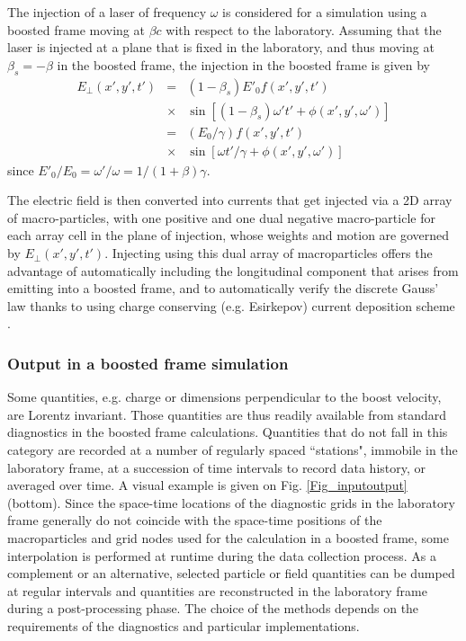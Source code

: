 The injection of a laser of frequency $\omega$ is considered for a simulation using a boosted frame moving at $\beta c$ with respect to the laboratory. Assuming that the laser is injected at a plane that is fixed in the laboratory, and thus moving at $\beta_s=-\beta$ in the boosted frame, the injection in the boosted frame is given by
\begin{eqnarray}
E_\perp\left(x',y',t'\right)&=&\left(1-\beta_s\right)E'_0 f\left(x',y',t'\right)\nonumber \\
&\times&\sin\left[\left(1-\beta_s\right)\omega' t'+\phi\left(x',y',\omega'\right)\right]\\
&=&\left(E_0/\gamma\right) f\left(x',y',t'\right) \nonumber\\
&\times&\sin\left[\omega t'/\gamma+\phi\left(x',y',\omega'\right)\right]
\end{eqnarray}
since $E'_0/E_0=\omega'/\omega=1/\left(1+\beta\right)\gamma$.

The electric field is then converted into currents that get injected via a 2D array of macro-particles, with one positive and one dual negative macro-particle for each array cell in the plane of injection, whose weights and motion are governed by $E_\perp\left(x',y',t'\right)$. Injecting using this dual array of macroparticles offers the advantage of automatically including the longitudinal component that arises from emitting into a boosted frame, and to automatically verify the discrete Gauss' law thanks to using charge conserving (e.g. Esirkepov) current deposition scheme \cite{Esirkepovcpc01}.

\subsubsection{Output in a boosted frame simulation}
Some quantities, e.g. charge or dimensions perpendicular to the boost velocity, are Lorentz invariant.
Those quantities are thus readily available from standard diagnostics in the boosted frame calculations. Quantities that do not fall in this category are recorded at a number of regularly spaced ``stations", immobile in the laboratory frame, at a succession of time intervals to record data history, or averaged over time. A visual example is given on Fig.  \ref{Fig_inputoutput} (bottom). Since the space-time locations of the diagnostic grids in the laboratory frame generally do not coincide with the space-time positions of the macroparticles and grid nodes used for the calculation in a boosted frame, some interpolation is performed at runtime during the data collection process. As a complement or an alternative, selected particle or field quantities can be dumped at regular intervals and quantities are reconstructed in the laboratory frame during a post-processing phase. The choice of the methods depends on the requirements of the diagnostics and particular implementations.
